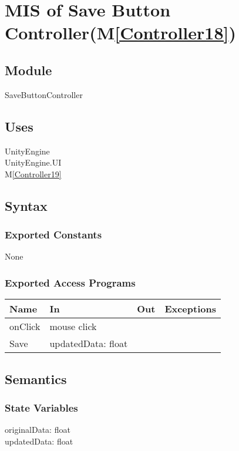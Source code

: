\documentclass[12pt, titlepage]{article}
\newcommand{\mref}[1]{M\ref{#1}}
\begin{document}
\newpage


\section{MIS of Save Button Controller(\mref{Controller18})}  

\subsection{Module}

SaveButtonController

\subsection{Uses}
UnityEngine\\
UnityEngine.UI\\
\mref{Controller19}

\subsection{Syntax}
\subsubsection{Exported Constants}
None
\subsubsection{Exported Access Programs}

\begin{center}
\begin{tabular}{| l | l | l | p{5cm}|}
\hline
\textbf{Name} & \textbf{In} & \textbf{Out} & \textbf{Exceptions} \\
\hline
onClick & mouse click &  &  \\
\hline
Save & updatedData: float &&\\
\hline
\end{tabular}
\end{center}

\subsection{Semantics}

\subsubsection{State Variables}
originalData: float\\
updatedData: float
\end{document}
